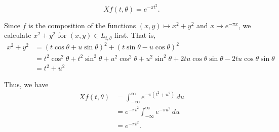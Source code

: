 \documentclass[12 pt, letterpaper]{hmcpset}
\begin{document}
\begin{solution}
	\[
		\boxed{
			Xf(t, \theta) = e^{-\pi t^{2}}.
		}
	\]

	Since $f$ is the composition of the functions $(x, y) \mapsto x^{2} + y^{2}$ and $x \mapsto e^{-\pi x}$, we calculate $x^{2} + y^{2}$ for $(x, y) \in L_{t, \theta}$ first. That is,
	\begin{align*}
		x^{2} + y^{2} & = (t \cos{\theta} + u \sin{\theta})^{2} + (t \sin{\theta} - u \cos{\theta})^{2} \\
			      & = t^{2} \cos^{2}{\theta} + t^{2} \sin^{2}{\theta} + u^{2} \cos^{2}{\theta} + u^{2} \sin^{2}{\theta} + 2tu \cos{\theta} \sin{\theta} - 2tu \cos{\theta} \sin{\theta} \\
			      & = t^{2} + u^{2}
	\end{align*}

	Thus, we have
	\begin{align*}
		Xf(t, \theta) & = \int_{-\infty}^{\infty} e^{-\pi(t^{2} + u^{2})} \, du \\
			      & = e^{-\pi t^{2}} \int_{-\infty}^{\infty} e^{-\pi u^{2}} \, du \\
			      & = e^{-\pi t^{2}}.
	\end{align*}
\end{solution}
\end{document}
